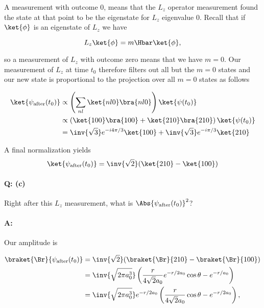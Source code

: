 {A measurement with outcome 0, means that the \(L_z\) operator measurement found the state at that point to be the eigenstate for \(L_z\) eigenvalue 0.  Recall that  if \(\ket{\phi}\) is an eigenstate of \(L_z\) we have

\begin{equation}\label{eqn:qmIexamPractice2007Dec:4:200}
L_z \ket{\phi} = m \Hbar \ket{\phi},
\end{equation}

so a measurement of \(L_z\) with outcome zero means that we have \(m=0\).  Our measurement of \(L_z\) at time \(t_0\) therefore filters out all but the \(m=0\) states and our new state is proportional to the projection over all \(m=0\) states as follows

\begin{equation}\label{eqn:qmIexamPractice:510}
\begin{aligned}
\ket{\psi_{\text{after}}(t_0)}
&\propto \left( \sum_{n l} \ket{n l 0}\bra{n l 0} \right) \ket{\psi(t_0)}  \\
&\propto \left( 
\ket{1 0 0}\bra{1 0 0} 
+\ket{2 1 0}\bra{2 1 0} 
\right) \ket{\psi(t_0)}  \\
&= 
\inv{\sqrt{3}} e^{-i 4 \pi / 3} \ket{100}
+\inv{\sqrt{3}} e^{- i \pi / 3 } \ket{210} 
\end{aligned}
\end{equation}

A final normalization yields
\begin{equation}\label{eqn:qmIexamPractice2007Dec:4:210}
\ket{\psi_{\text{after}}(t_0)}
= \inv{\sqrt{2}} (\ket{210} - \ket{100})
\end{equation}

\paragraph{Q: (c)}

Right after this \(L_z\) measurement, what is \(\Abs{\psi_{\text{after}}(t_0)}^2\)?

\paragraph{A:}

Our amplitude is 

\begin{equation}\label{eqn:qmIexamPractice:530}
\begin{aligned}
\braket{\Br}{\psi_{\text{after}}(t_0)}
&= \inv{\sqrt{2}} (\braket{\Br}{210} - \braket{\Br}{100}) \\
&= \inv{\sqrt{2 \pi a_0^3}}
\left(
\frac{r}{4\sqrt{2} a_0} e^{-r/2a_0} \cos\theta
-e^{-r/a_0}
\right) \\
&= \inv{\sqrt{2 \pi a_0^3}}
e^{-r/2 a_0} 
\left(
\frac{r}{4\sqrt{2} a_0} \cos\theta
-e^{-r/2 a_0}
\right),
\end{aligned}
\end{equation}

}
